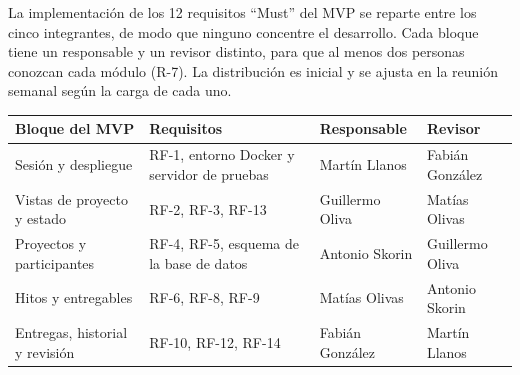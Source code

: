 \documentclass[10pt,a4paper]{article}
\newcommand{\hrow}{\rowcolor{encabezado}}
\newcommand{\h}[1]{\textbf{#1}}
\begin{document}
La implementación de los 12 requisitos ``Must'' del MVP se reparte entre los cinco integrantes, de modo que ninguno concentre el desarrollo. Cada bloque tiene un responsable y un revisor distinto, para que al menos dos personas conozcan cada módulo (R-7). La distribución es inicial y se ajusta en la reunión semanal según la carga de cada uno.

\begin{xltabular}{\linewidth}{|P{4.2cm}|L|P{3.2cm}|P{3.2cm}|}
\hline\hrow \h{Bloque del MVP} & \h{Requisitos} & \h{Responsable} & \h{Revisor} \\ \hline
\endhead
Sesión y despliegue & RF-1, entorno Docker y servidor de pruebas & Martín Llanos & Fabián González \\ \hline
Vistas de proyecto y estado & RF-2, RF-3, RF-13 & Guillermo Oliva & Matías Olivas \\ \hline
Proyectos y participantes & RF-4, RF-5, esquema de la base de datos & Antonio Skorin & Guillermo Oliva \\ \hline
Hitos y entregables & RF-6, RF-8, RF-9 & Matías Olivas & Antonio Skorin \\ \hline
Entregas, historial y revisión & RF-10, RF-12, RF-14 & Fabián González & Martín Llanos \\ \hline
\end{xltabular}

\clearpage
\end{document}
